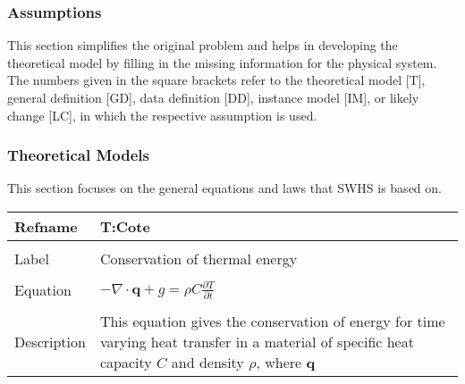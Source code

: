 \documentclass[12pt]{article}
\begin{document}
\subsubsection{Assumptions}
\label{Sec:A}
This section simplifies the original problem and helps in developing the theoretical model by filling in the missing information for the physical system. The numbers given in the square brackets refer to the theoretical model [T], general definition [GD], data definition [DD], instance model [IM], or likely change [LC], in which the respective assumption is used.
\subsubsection{Theoretical Models}
\label{Sec:TM}
This section focuses on the general equations and laws that SWHS is based on.
~\newline
\noindent \begin{minipage}{\textwidth}
\begin{tabular}{p{} p{}}
\toprule \textbf{Refname} & \textbf{T:Cote}
\label{T:Cote}
\\ \midrule \\
Label & Conservation of thermal energy
\\ \midrule \\
Equation & $-\nabla{}\cdot{}\mathbf{q}+g=\rho{}C\frac{\partial{}T}{\partial{}t}$
\\ \midrule \\
Description & This equation gives the conservation of energy for time varying heat transfer in a material of specific heat capacity $C$ and density $\rho{}$, where $\mathbf{q}$
\\ \bottomrule \end{tabular}
\end{minipage}\\
\end{document}
